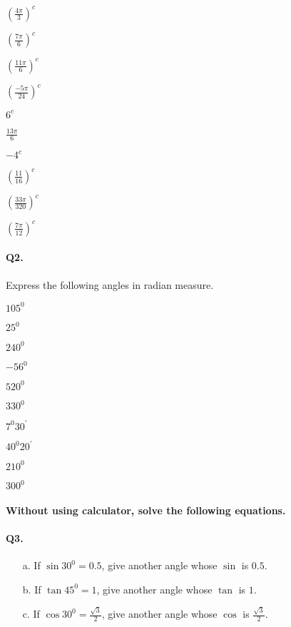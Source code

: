 \documentclass{article}
\begin{document}
\begin{enumerate*}[label=\alph*.]
  \item $\left(\frac{4\pi}{3}\right)^{c}$
  \item $\left(\frac{7\pi}{6}\right)^{c}$
  \item $\left(\frac{11\pi}{6}\right)^{c}$
  \item $\left(\frac{-5\pi}{24}\right)^{c}$
  \item $6^{c}$
  \item $\frac{13\pi}{6}$
  \item $-4^{c}$
  \item $\left(\frac{11}{16}\right)^{c}$
  \item $\left(\frac{33\pi}{320}\right)^{c}$
  \item $\left(\frac{7\pi}{12}\right)^{c}$
\end{enumerate*}

\paragraph{Q2.}
Express the following angles in radian measure.

\begin{enumerate*}[label=\alph*.]
  \item $105^{0}$
  \item $25^{0}$
  \item $240^{0}$
  \item $-56^{0}$
  \item $520^{0}$
  \item $330^{0}$
  \item $7^{0}30^{'}$
  \item $40^{0}20^{'}$
  \item $210^{0}$
  \item $300^{0}$
\end{enumerate*}

\paragraph{Without using calculator, solve the following equations.}
\paragraph{Q3.}
\begin{enumerate}
  \item[a.] If $\sin30^{0} = 0.5$, give another angle whose $\sin$ is $0.5$.
  \item[b.] If $\tan45^{0} = 1$, give another angle whose $\tan$ is $1$.
  \item[c.] If $\cos30^{0} = \frac{\sqrt{3}}{2}$, give another angle whose $\cos$ is $\frac{\sqrt{3}}{2}$.
\end{enumerate}
\end{document}
